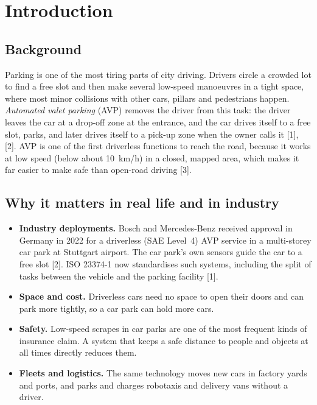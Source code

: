 \documentclass[12pt,a4paper]{article}
\begin{document}
\setcounter{page}{1}
\section{Introduction}
\subsection{Background}
Parking is one of the most tiring parts of city driving. Drivers circle a crowded lot to find a free slot and then make several low-speed manoeuvres in a tight space, where most minor collisions with other cars, pillars and pedestrians happen. \emph{Automated valet parking} (AVP) removes the driver from this task: the driver leaves the car at a drop-off zone at the entrance, and the car drives itself to a free slot, parks, and later drives itself to a pick-up zone when the owner calls it [1], [2]. AVP is one of the first driverless functions to reach the road, because it works at low speed (below about 10~km/h) in a closed, mapped area, which makes it far easier to make safe than open-road driving [3].

\subsection{Why it matters in real life and in industry}
\begin{itemize}[itemsep=0pt,topsep=2pt]
\item \textbf{Industry deployments.} Bosch and Mercedes-Benz received approval in Germany in 2022 for a driverless (SAE Level~4) AVP service in a multi-storey car park at Stuttgart airport. The car park's own sensors guide the car to a free slot [2]. ISO 23374-1 now standardises such systems, including the split of tasks between the vehicle and the parking facility [1].
\item \textbf{Space and cost.} Driverless cars need no space to open their doors and can park more tightly, so a car park can hold more cars.
\item \textbf{Safety.} Low-speed scrapes in car parks are one of the most frequent kinds of insurance claim. A system that keeps a safe distance to people and objects at all times directly reduces them.
\item \textbf{Fleets and logistics.} The same technology moves new cars in factory yards and ports, and parks and charges robotaxis and delivery vans without a driver.
\end{itemize}
\end{document}
